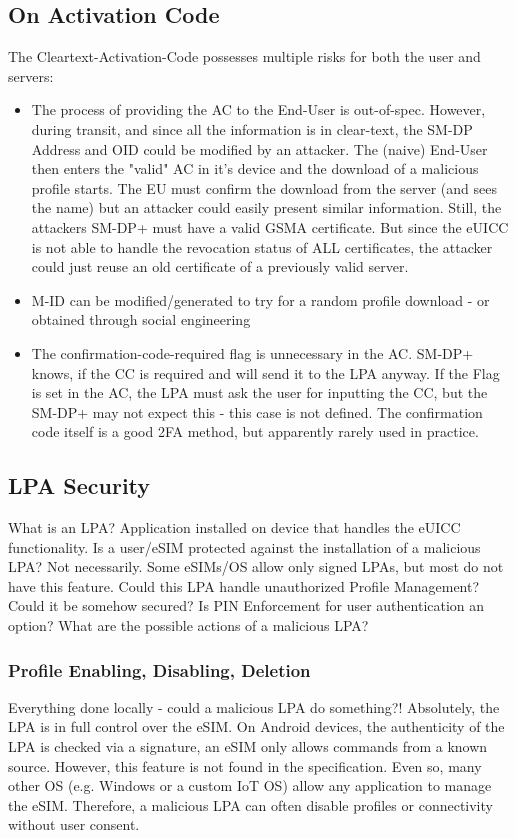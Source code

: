 \subsection{On Activation Code}
The Cleartext-Activation-Code possesses multiple risks for both the user and servers: 
\begin{itemize}
    \item The process of providing the AC to the End-User is out-of-spec. However, during transit, and since all the information is in clear-text, the SM-DP Address and OID could be modified by an attacker. The (naive) End-User then enters the "valid" AC in it's device and the download of a malicious profile starts. The EU must confirm the download from the server (and sees the name) but an attacker could easily present similar information. Still, the attackers SM-DP+ must have a valid GSMA certificate. But since the eUICC is not able to handle the revocation status of ALL certificates, the attacker could just reuse an old certificate of a previously valid server.
    \item M-ID can be modified/generated to try for a random profile download - or obtained through social engineering
    \item The confirmation-code-required flag is unnecessary in the AC. SM-DP+ knows, if the CC is required and will send it to the LPA anyway. If the Flag is set in the AC, the LPA must ask the user for inputting the CC, but the SM-DP+ may not expect this - this case is not defined. The confirmation code itself is a good 2FA method, but apparently rarely used in practice.
\end{itemize}

\subsection{LPA Security} \label{chapter:LPA}

What is an LPA? Application installed on device that handles the eUICC functionality.
Is a user/eSIM protected against the installation of a malicious LPA? Not necessarily. Some eSIMs/OS allow only signed LPAs, but most do not have this feature. 
Could this LPA handle unauthorized Profile Management? Could it be somehow secured? Is PIN Enforcement for user authentication an option? What are the possible actions of a malicious LPA?

\subsubsection{Profile Enabling, Disabling, Deletion} 
Everything done locally - could a malicious LPA do something?!
Absolutely, the LPA is in full control over the eSIM. On Android devices, the authenticity of the LPA is checked via a signature, an eSIM only allows commands from a known source. However, this feature is not found in the specification. Even so, many other OS (e.g. Windows or a custom IoT OS) allow any application to manage the eSIM. Therefore, a malicious LPA can often disable profiles or connectivity without user consent. 

